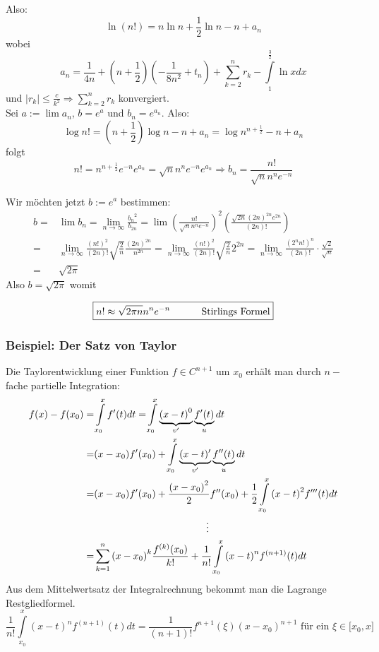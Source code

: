 \noindent Also:
\[\ln (n!) = n\ln n + \frac{1}{2}\ln n - n + {a_n}\]
wobei
\[{a_n} = {\frac{1}{{4n}} + \left( {n + \frac{1}{2}} \right)\left( { - \frac{1}{{8{n^2}}} + {t_n}} \right)} + \sum\limits_{k = 2}^n {{r_k} - \int\limits_1^{\frac{3}{2}} {\ln xdx} } \]
und $\left| {{r_k}} \right| \le \frac{c}{{{k^2}}} \Rightarrow \sum\limits_{k = 2}^n {{r_k}} $ konvergiert.\\

\noindent Sei $a:=\lim a_n$, $b=e^a$ und $b_n=e^{a_n}$. Also:
\[\log n! = \left( {n + \frac{1}{2}} \right)\log n - n + {a_n} = \log {n^{n + \frac{1}{2}}} - n + {a_n}\]
folgt
\[n! = {n^{n + \frac{1}{2}}}{e^{ - n}}{e^{{a_n}}} = \sqrt n {n^n}{e^{ - n}}{e^{{a_n}}} \Rightarrow {b_n} = \frac{{n!}}{{\sqrt n {n^n}{e^{ - n}}}}\]

\noindent Wir möchten jetzt $b:=e^a$ bestimmen:
\begin{align*}
b =&\lim {b_n} = \mathop {\lim }\limits_{n \to \infty } \frac{{{b_n}^2}}{{{b_{2n}}}} = \lim {\left( {\frac{{n!}}{{\sqrt n {n^n}{e^{ - n}}}}} \right)^2}\left( {\frac{{\sqrt {2n} {{(2n)}^{2n}}{e^{2n}}}}{{(2n)!}}} \right)\\
=&\mathop {\lim }\limits_{n \to \infty } \frac{{{{(n!)}^2}}}{{(2n)!}}\sqrt {\frac{2}{n}} \frac{{{{(2n)}^{2n}}}}{{{n^{2n}}}} = \mathop {\lim }\limits_{n \to \infty } \frac{{{{(n!)}^2}}}{{(2n)!}}\sqrt {\frac{2}{n}} {2^{2n}} = \mathop {\lim }\limits_{n \to \infty } \frac{{{{({2^n}n!)}^n}}}{{(2n)!}} \cdot \frac{{\sqrt 2 }}{{\sqrt n }}\\
=&\sqrt {2\pi}
\end{align*}
\noindent Also $b=\sqrt{2\pi}$ womit

\[\boxed{n! \approx \sqrt {2\pi n} {n^n}{e^{ - n}}\text{\hspace{10mm} Stirlings Formel}}\]

\subsubsection*{Beispiel: Der Satz von Taylor}
Die Taylorentwicklung einer Funktion $f\in C^{n+1}$ um $x_0$ erhält man durch $n-$fache partielle Integration:
\begin{align*}
f(x) - f({x_0}) =&\int\limits_{{x_0}}^x {f'(t)dt = } \int\limits_{{x_0}}^x {\underbrace {{{(x - t)}^0}}_{v'}\underbrace {f'(t)}_udt}\\
 =&(x - {x_0})f'({x_0}) + \int\limits_{{x_0}}^x {\underbrace {(x - t)'}_{v'}} \underbrace {f''(t)}_udt\\
 =&(x - {x_0})f'({x_0}) + \frac{{{{(x - {x_0})}^2}}}{2}f''({x_0}) + \frac{1}{2}\int\limits_{{x_0}}^x {{{(x - t)}^2}f'''(t)dt} \\
&\hspace{40mm}\vdots\\
=&\sum\limits_{k = 1}^n {{{(x - {x_0})}^k}\frac{{{f^{(k)}}({x_0})}}{{k!}}}  + \frac{1}{{n!}}\int\limits_{{x_0}}^x {{{(x - t)}^n}{f^{(n + 1)}}(t)dt}
\end{align*}
Aus dem Mittelwertsatz der Integralrechnung bekommt man die Lagrange Restgliedformel.
\[\frac{1}{{n!}}\int\limits_{{x_0}}^x {{{(x - t)}^n}{f^{(n + 1)}}(t)dt}  = \frac{1}{{(n + 1)!}}{f^{n + 1}}(\xi ){(x - {x_0})^{n + 1}}\text{ für ein }\xi\in\lbrack x_0,x\rbrack\]

